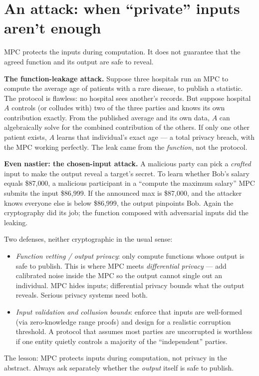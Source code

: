 \section{An attack: when ``private'' inputs aren't enough}
\label{ch34:attack}

MPC protects the inputs during computation. It does not guarantee that the agreed function and its output are safe to reveal.

\begin{attackbox}
\textbf{The function-leakage attack.} Suppose three hospitals run an MPC to compute the average age of patients with a rare disease, to publish a statistic. The protocol is flawless: no hospital sees another's records. But suppose hospital $A$ controls (or colludes with) two of the three parties and knows its own contribution exactly. From the published average and its own data, $A$ can algebraically solve for the combined contribution of the others. If only one other patient exists, $A$ learns that individual's exact age --- a total privacy breach, with the MPC working perfectly. The leak came from the \emph{function}, not the protocol.

\textbf{Even nastier: the chosen-input attack.} A malicious party can pick a \emph{crafted} input to make the output reveal a target's secret. To learn whether Bob's salary equals \$87{,}000, a malicious participant in a ``compute the maximum salary'' MPC submits the input \$86{,}999. If the announced max is \$87{,}000, and the attacker knows everyone else is below \$86{,}999, the output pinpoints Bob. Again the cryptography did its job; the function composed with adversarial inputs did the leaking.
\end{attackbox}

\begin{trapbox}
Two defenses, neither cryptographic in the usual sense:
\begin{itemize}
  \item \emph{Function vetting / output privacy}: only compute functions whose output is safe to publish. This is where MPC meets \emph{differential privacy} --- add calibrated noise inside the MPC so the output cannot single out an individual. MPC hides inputs; differential privacy bounds what the output reveals. Serious privacy systems need both.
  \item \emph{Input validation and collusion bounds}: enforce that inputs are well-formed (via zero-knowledge range proofs) and design for a realistic corruption threshold. A protocol that assumes most parties are uncorrupted is worthless if one entity quietly controls a majority of the ``independent'' parties.
\end{itemize}
The lesson: MPC protects inputs during computation, not privacy in the abstract. Always ask separately whether the \emph{output} itself is safe to publish.
\end{trapbox}

